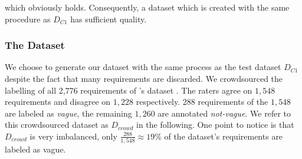 which obviously holds.
Consequently, a dataset which is created with the same procedure as $D_{C1}$ has sufficient quality.

\subsubsection{The Dataset}
We choose to generate our dataset with the same process as the test dataset $D_{C1}$ despite the fact that many requirements are discarded.
We crowdsourced the labelling of all 2,776 requirements of \citeauthor{Kummeth:2020}'s dataset \parencite{Kummeth:2020}.
The raters agree on $1,548$ requirements and disagree on $1,228$ respectively.
$288$ requirements of the $1,548$ are labeled as \textit{vague}, the remaining $1,260$ are annotated \textit{not-vague}.
We refer to this crowdsourced dataset as $D_{crowd}$ in the following.
One point to notice is that $D_{crowd}$ is very imbalanced, only $\frac{288}{1,548} \approx 19\%$ of the dataset's requirements are labeled as vague.
